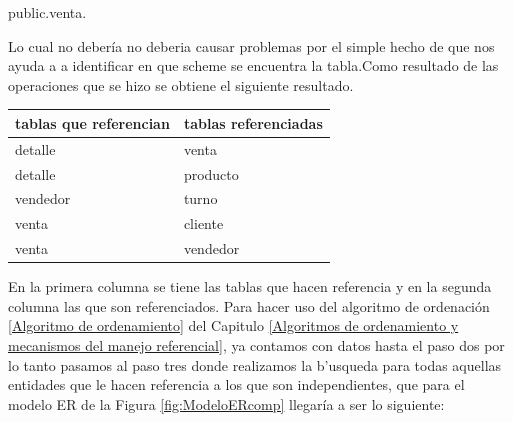 public.venta.

Lo cual no deber\'ia no deberia causar problemas por el simple hecho de que nos ayuda a a identificar en que scheme se encuentra la tabla.Como resultado de las operaciones que se hizo se obtiene el siguiente resultado.
\begin{center}
\scriptsize
  \renewcommand{\arrayrulewidth}{1pt}
  \label{table3} %
\begin{tabular}{|p{40mm}|p{98mm}|}
\hline
\textbf{tablas que referencian} & \textbf{tablas referenciadas} \\ \hline
detalle                         & venta                         \\ \hline
detalle                         & producto                      \\ \hline
vendedor                        & turno                         \\ \hline
venta                        & cliente                       \\ \hline
venta                           & vendedor                      \\ \hline
\end{tabular}
\end{center}
En la primera columna se tiene las tablas que hacen referencia y en la segunda columna las que son referenciados. Para hacer uso del algoritmo de ordenaci\'on \ref{Algoritmo de ordenamiento} del Capitulo \ref{Algoritmos de ordenamiento y mecanismos del manejo referencial},  ya contamos con datos hasta el paso dos por lo tanto pasamos al paso tres donde realizamos la b'usqueda para todas aquellas entidades que le hacen referencia a los que son independientes, que para el modelo ER de la Figura \ref{fig:ModeloERcomp} llegar\'ia a ser lo siguiente:
